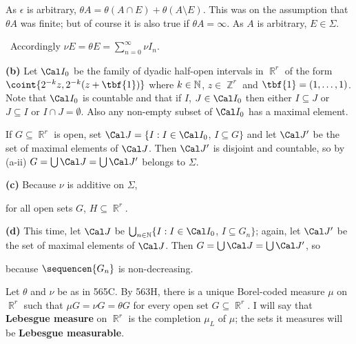 {\noindent As $\epsilon$ is arbitrary,
$\theta A=\theta(A\cap E)+\theta(A\setminus E)$.   This was on the
assumption that $\theta A$ was finite;  but of course it is also true if
$\theta A=\infty$.   As $A$ is arbitrary, $E\in\Sigma$.\ \Qed

\medskip

\qquad\grheadc\ Accordingly $\nu E=\theta E=\sum_{n=0}^{\infty}\nu I_n$.

\medskip

{\bf (b)} Let $\Cal I_0$ be the family of dyadic half-open intervals in
$\BbbR^r$ of the form $\coint{2^{-k}z,2^{-k}(z+\tbf{1})}$ where
$k\in\Bbb N$, $z\in\BbbZ^r$ and $\tbf{1}=(1,\ldots,1)$.   Note that
$\Cal I_0$ is countable and that if $I$, $J\in\Cal I_0$ then either
$I\subseteq J$ or $J\subseteq I$ or $I\cap J=\emptyset$.   Also any
non-empty subset of $\Cal I_0$ has a maximal element.

If $G\subseteq\BbbR^r$ is open, set
$\Cal J=\{I:I\in\Cal I_0$, $I\subseteq G\}$ and let $\Cal J'$ be the set of
maximal elements of $\Cal J$.   Then $\Cal J'$ is disjoint and countable,
so by (a-ii) $G=\bigcup\Cal J=\bigcup\Cal J'$ belongs to $\Sigma$.

\medskip

{\bf (c)} Because $\nu$ is additive on $\Sigma$,


\noindent for all open sets $G$, $H\subseteq\BbbR^r$.

\medskip

{\bf (d)} This time, let $\Cal J$ be
$\bigcup_{n\in\Bbb N}\{I:I\in\Cal I_0$, $I\subseteq G_n\}$;  again, let
$\Cal J'$ be the set of maximal elements of $\Cal J$.   Then
$G=\bigcup\Cal J=\bigcup\Cal J'$, so


\noindent because $\sequencen{G_n}$ is non-decreasing.
}%

 Let $\theta$ and $\nu$ be as in 565C.
By 563H, there is a unique Borel-coded measure
$\mu$ on $\BbbR^r$ such that $\mu G=\nu G=\theta G$ for every open set
$G\subseteq\BbbR^r$.   I will say that {\bf Lebesgue measure} on $\BbbR^r$
is the completion $\mu_L$ of $\mu$;
the sets it measures will be {\bf Lebesgue measurable}.

